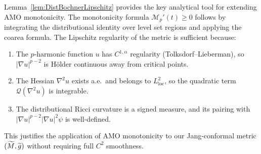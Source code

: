 \begin{remark}
Lemma~\ref{lem:DistBochnerLipschitz} provides the key analytical tool for extending AMO monotonicity. The monotonicity formula $\mathcal{M}_p'(t) \ge 0$ follows by integrating the distributional identity over level set regions and applying the coarea formula. The Lipschitz regularity of the metric is sufficient because:
\begin{enumerate}
    \item The $p$-harmonic function $u$ has $C^{1,\alpha}$ regularity (Tolksdorf--Lieberman), so $|\nabla u|^{p-2}$ is H\"older continuous away from critical points.
    \item The Hessian $\nabla^2 u$ exists a.e.\ and belongs to $L^2_{\mathrm{loc}}$, so the quadratic term $\mathcal{Q}(\nabla^2 u)$ is integrable.
    \item The distributional Ricci curvature is a signed measure, and its pairing with $|\nabla u|^{p-2}|\nabla u|^2 \psi$ is well-defined.
\end{enumerate}
This justifies the application of AMO monotonicity to our Jang-conformal metric $(\widetilde{M}, \widetilde{g})$ without requiring full $C^2$ smoothness.
\end{remark}

